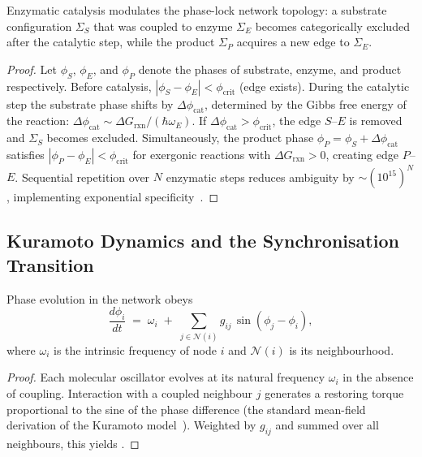 \begin{theorem}
\label{thm:ch03-dynamic-exclusion}
Enzymatic catalysis modulates the phase-lock network topology: a substrate
configuration $\Sigma_S$ that was coupled to enzyme $\Sigma_E$ becomes
categorically excluded after the catalytic step, while the product
$\Sigma_P$ acquires a new edge to $\Sigma_E$.
\end{theorem}

\begin{proof}
Let $\phi_S$, $\phi_E$, and $\phi_P$ denote the phases of substrate, enzyme,
and product respectively.  Before catalysis,
$|\phi_S-\phi_E|<\phi_{\mathrm{crit}}$ (edge exists).  During the catalytic
step the substrate phase shifts by $\Delta\phi_{\mathrm{cat}}$, determined by
the Gibbs free energy of the reaction:
$\Delta\phi_{\mathrm{cat}}\sim\Delta G_{\mathrm{rxn}}/(\hbar\omega_E)$.  If
$\Delta\phi_{\mathrm{cat}}>\phi_{\mathrm{crit}}$, the edge $S$--$E$ is
removed and $\Sigma_S$ becomes excluded.  Simultaneously, the product phase
$\phi_P=\phi_S+\Delta\phi_{\mathrm{cat}}$ satisfies
$|\phi_P-\phi_E|<\phi_{\mathrm{crit}}$ for exergonic reactions with
$\Delta G_{\mathrm{rxn}}>0$, creating edge $P$--$E$.  Sequential repetition
over $N$ enzymatic steps reduces ambiguity by $\sim(10^{15})^N$,
implementing exponential specificity~\citep{fersht1999structure}.
\end{proof}

\subsection{Kuramoto Dynamics and the Synchronisation Transition}

\begin{theorem}
\label{thm:ch03-kuramoto}
Phase evolution in the network obeys
\begin{equation}
    \frac{d\phi_i}{dt}
    \;=\;
    \omega_i
    \;+\;
    \sum_{j\in\mathcal{N}(i)} g_{ij}\,\sin(\phi_j-\phi_i),
    \label{eq:ch03-kuramoto}
\end{equation}
where $\omega_i$ is the intrinsic frequency of node $i$ and
$\mathcal{N}(i)$ is its neighbourhood.
\end{theorem}

\begin{proof}
Each molecular oscillator evolves at its natural frequency $\omega_i$ in the
absence of coupling.  Interaction with a coupled neighbour $j$ generates a
restoring torque proportional to the sine of the phase difference (the
standard mean-field derivation of the Kuramoto
model~\citep{kuramoto1984chemical,strogatz2000kuramoto}).  Weighted by
$g_{ij}$ and summed over all neighbours, this yields
.
\end{proof}


